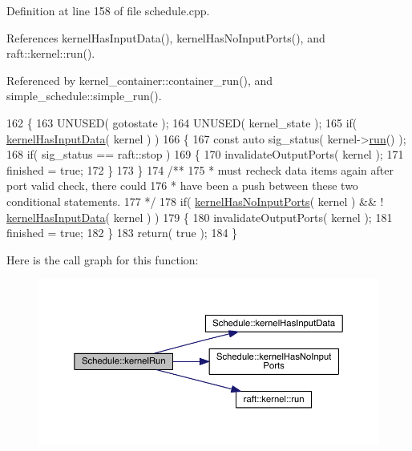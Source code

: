 Definition at line 158 of file schedule.\+cpp.



References kernel\+Has\+Input\+Data(), kernel\+Has\+No\+Input\+Ports(), and raft\+::kernel\+::run().



Referenced by kernel\+\_\+container\+::container\+\_\+run(), and simple\+\_\+schedule\+::simple\+\_\+run().


\begin{DoxyCode}
162 \{
163    UNUSED( gotostate );
164    UNUSED( kernel\_state );
165    \textcolor{keywordflow}{if}( \hyperlink{class_schedule_ac23de3dd63554401fd0d8d23b60eecfa}{kernelHasInputData}( kernel ) )
166    \{
167       \textcolor{keyword}{const} \textcolor{keyword}{auto} sig\_status( kernel->\hyperlink{classraft_1_1kernel_a05094286d7577360fb1b91c91fc05901}{run}() );
168       \textcolor{keywordflow}{if}( sig\_status == raft::stop )
169       \{
170          invalidateOutputPorts( kernel );
171          finished = \textcolor{keyword}{true};
172       \}
173    \}\textcolor{comment}{}
174 \textcolor{comment}{   /**}
175 \textcolor{comment}{    * must recheck data items again after port valid check, there could}
176 \textcolor{comment}{    * have been a push between these two conditional statements.}
177 \textcolor{comment}{    */}
178    \textcolor{keywordflow}{if}(  \hyperlink{class_schedule_a2e2035e0c0666054f8401ad2b3792854}{kernelHasNoInputPorts}( kernel ) && ! 
      \hyperlink{class_schedule_ac23de3dd63554401fd0d8d23b60eecfa}{kernelHasInputData}( kernel ) )
179    \{
180       invalidateOutputPorts( kernel );
181       finished = \textcolor{keyword}{true};
182    \}
183    \textcolor{keywordflow}{return}( \textcolor{keyword}{true} );
184 \}
\end{DoxyCode}
Here is the call graph for this function\+:
\nopagebreak
\begin{figure}[H]
\begin{center}
\leavevmode
\includegraphics[width=350pt]{class_schedule_acf28b4a4231e693585751a035873615c_cgraph}
\end{center}
\end{figure}
\hypertarget{class_schedule_a5167d622689a34ea5f3a065304295521}{}\label{class_schedule_a5167d622689a34ea5f3a065304295521} 
